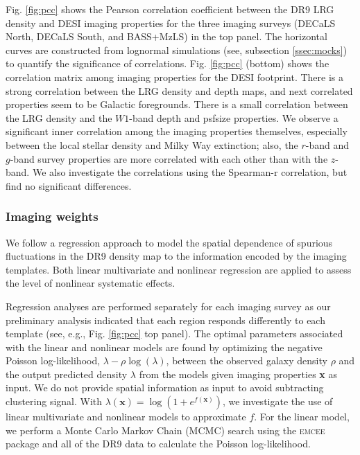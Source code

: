 Fig. \ref{fig:pcc} shows the Pearson correlation coefficient between the DR9 LRG density and DESI imaging properties for the three imaging surveys (DECaLS North, DECaLS South, and BASS+MzLS) in the top panel. The horizontal curves are constructed from lognormal simulations (see, subsection \ref{ssec:mocks}) to quantify the significance of correlations. Fig. \ref{fig:pcc} (bottom) shows the correlation matrix among imaging properties for the DESI footprint. There is a strong correlation between the LRG density and depth maps, and next correlated properties seem to be Galactic foregrounds. There is a small correlation between the LRG density and the $W1$-band depth and psfsize properties. We observe a significant inner correlation among the imaging properties themselves, especially between the local stellar density and Milky Way extinction; also, the $r$-band and $g$-band survey properties are more correlated with each other than with the $z$-band. We also investigate the correlations using the Spearman-r correlation, but find no significant differences.

\subsubsection{Imaging weights}
We follow a regression approach to model the spatial dependence of spurious fluctuations in the DR9 density map to the information encoded by the imaging templates. Both linear multivariate and nonlinear regression are applied to assess the level of nonlinear systematic effects. 

Regression analyses are performed separately for each imaging survey as our preliminary analysis indicated that each region responds differently to each template (see, e.g., Fig. \ref{fig:pcc} top panel). The optimal parameters associated with the linear and nonlinear models are found by optimizing the negative Poisson log-likelihood, $\lambda - \rho \log(\lambda)$, between the observed galaxy density $\rho$ and the output predicted density $\lambda$ from the models given imaging properties \textbf{x} as input. We do not provide spatial information as input to avoid subtracting clustering signal. With $\lambda(\textbf{x}) = \log (1+e^{f(\textbf{x})})$, we investigate the use of linear multivariate and nonlinear models to approximate $f$. For the linear model, we perform a Monte Carlo Markov Chain (MCMC) search using the \textsc{emcee} package \citep{2013PASP..125..306F} and all of the DR9 data to calculate the Poisson log-likelihood. 

